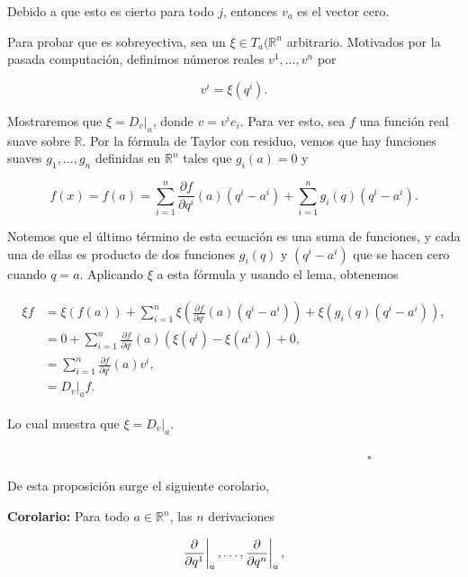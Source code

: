 \documentclass[a4paper,10pt]{article}
\numberwithin{equation}{section}
\newcommand{\zerodel}{.\kern-\nulldelimiterspace}
\newcommand{\corolario}{\textbf{Corolario: }}
\begin{document}
Debido a que esto es cierto para todo $j$, entonces $v_a$ es el vector 
cero. 

\vspace{.3cm}

Para probar que es sobreyectiva, sea un $\xi \in T_a(\mathbb{R}^n$ arbitrario. 
Motivados por la pasada computación, definimos números reales $v^1,\dots,v^n$ 
por 

\begin{equation}
 v^i = \xi(q^i).
\end{equation}

Mostraremos que $\xi = D_v|_a$, donde $v = v^ie_i$. Para ver esto, 
sea $f$ una función real suave sobre $\mathbb{R}$. Por la fórmula 
de Taylor con residuo, vemos que hay funciones suaves $g_1,\dots,g_n$ 
definidas en $\mathbb{R}^n$ tales que $g_i(a) = 0$ y 

\begin{equation}
 f(x) = f(a) = \sum_{i=1}^n \frac{\partial f}{\partial q^i}(a) (q^i - a^i) 
 + \sum_{i=1}^n g_i(q) (q^i - a^i).
\end{equation}

Notemos que el último término de esta ecuación es una suma de funciones, 
y cada una de ellas es producto de dos funciones $g_i(q)$ y $(q^i - a^i)$ que 
se hacen cero cuando $q=a$. Aplicando $\xi$ a esta fórmula y usando 
el lema, obtenemos 

\begin{align}
 \begin{split}
  \xi f &= \xi(f(a)) + \sum_{i=1}^n \xi \left( \frac{\partial f}{\partial q^i}(a) (q^i - a^i)\right) 
  + \xi (g_i(q) (q^i - a^i)), \\
	&= 0 + \sum_{i=1}^n \frac{\partial f}{\partial q^i}(a)(\xi(q^i)- \xi(a^i)) + 0, \\
	&= \sum_{i=1}^n \frac{\partial f}{\partial q^i}(a)v^i, \\
	&= D_v|_a f.
 \end{split}
\end{align}

Lo cual muestra que $\xi = D_v|_a$.

$\hspace{12cm} \square$

De esta proposición surge el siguiente corolario, 

\vspace{.3cm}

\corolario Para todo $a \in \mathbb{R}^n$, las $n$ derivaciones 

\begin{equation}
 \left\zerodel\frac{\partial}{\partial q^1}\right|_a, \dots, 
  \left\zerodel\frac{\partial}{\partial q^n}\right|_a,
\end{equation}
\end{document}
